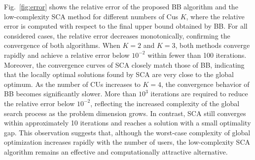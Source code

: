 \documentclass[runningheads]{llncs}
\begin{document}
Fig.~\ref{fig:error} shows the relative error of the proposed BB algorithm and the low-complexity SCA method for different numbers of Cus $K$, where the relative error is computed with respect to the final upper bound obtained by BB. For all considered cases, the relative error decreases monotonically, confirming the convergence of both algorithms. When $K=2$ and $K=3$, both methods converge rapidly and achieve a relative error below $10^{-2}$ within fewer than 100 iterations. Moreover, the convergence curves of SCA closely match those of BB, indicating that the locally optimal solutions found by SCA are very close to the global optimum. As the number of CUs increases to $K=4$, the convergence behavior of BB becomes significantly slower. More than $10^3$ iterations are required to reduce the relative error below $10^{-2} $, reflecting the increased complexity of the global search process as the problem dimension grows. In contrast, SCA still converges within approximately 10 iterations and reaches a solution with a small optimality gap. This observation suggests that, although the worst-case complexity of global optimization increases rapidly with the number of users, the low-complexity SCA algorithm remains an effective and computationally attractive alternative.
 
\end{document}
